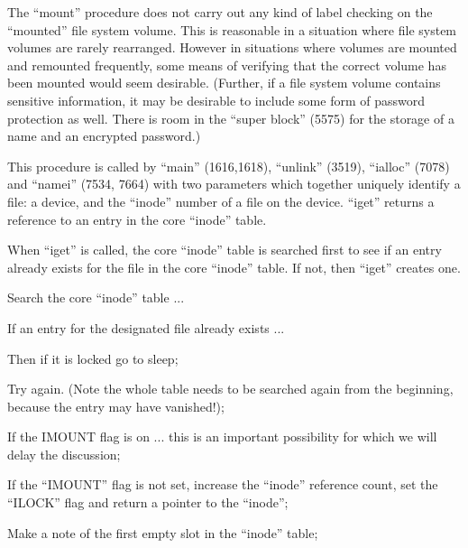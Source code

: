 \item[2.] The ``mount'' procedure does not carry
out  any  kind of label checking on the
``mounted'' file system volume.  This  is
reasonable  in  a  situation where file
system volumes are  rarely  rearranged.
However in situations where volumes are
mounted and remounted frequently,  some
means  of  verifying  that  the correct
volume  has  been  mounted  would  seem
desirable.   (Further,  if a file system
volume contains sensitive  information,
it  may  be  desirable  to include some
form of password  protection  as  well.
There  is  room  in  the  ``super block''
(5575) for the storage of a name and an
encrypted password.)
\ed


This  procedure  is  called  by  ``main''
(1616,1618),  ``unlink'' (3519), ``ialloc''
(7078) and ``namei''  (7534,  7664)  with
two  parameters which together uniquely
identify a  file:  a  device,  and  the
``inode'' number of a file on the device.
``iget'' returns a reference to an  entry
in the core ``inode'' table.


When ``iget'' is called, the core ``inode''
table  is  searched  first to see if an
entry already exists for  the  file  in
the  core  ``inode''  table. If not, then
``iget'' creates one.

\bd
\item[7285:] Search the core ``inode'' table ...

\item[7286:] If an entry  for  the  designated
file already exists ...

\item[7287:] Then if it is locked go to sleep;


\item[7290:] Try again. (Note the whole  table
  needs  to  be searched again from
  the beginning, because the  entry
  may have vanished!);

\item[7292:] If the IMOUNT flag  is  on  ...
this  is an important possibility
for which we will delay the  discussion;

\item[7302:] If the ``IMOUNT'' flag is not  set,
increase  the  ``inode''  reference
count, set the ``ILOCK''  flag  and
return a pointer to the ``inode'';


\item[7306:] Make a note of  the  first  empty
      slot in the ``inode'' table;

